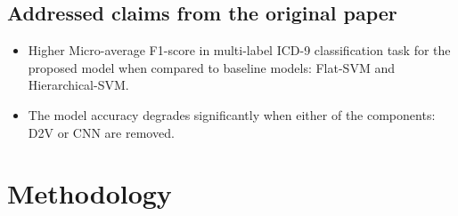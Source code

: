 \documentclass[11pt,a4paper]{article}
\begin{document}
\subsection{Addressed claims from the original paper}


\begin{itemize}
    \item Higher Micro-average F1-score in multi-label ICD-9 classification task for the proposed model when compared to baseline models: Flat-SVM and Hierarchical-SVM.
    \item The model accuracy degrades significantly when either of the components: D2V or CNN are removed.
\end{itemize}


\section{Methodology}
\end{document}

